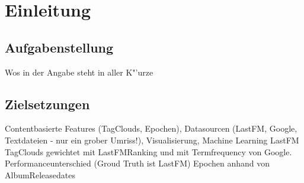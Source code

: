 \section{Einleitung}

\subsection{Aufgabenstellung}
Wos in der Angabe steht in aller K"'urze

\subsection{Zielsetzungen}
Contentbasierte Features (TagClouds, Epochen), Datasourcen (LastFM, Google, Textdateien - nur ein grober Umriss!), Visualisierung, Machine Learning
LastFM TagClouds gewichtet mit LastFMRanking und mit Termfrequency von Google. Performanceunterschied (Groud Truth ist LastFM)
Epochen anhand von AlbumReleasedates
